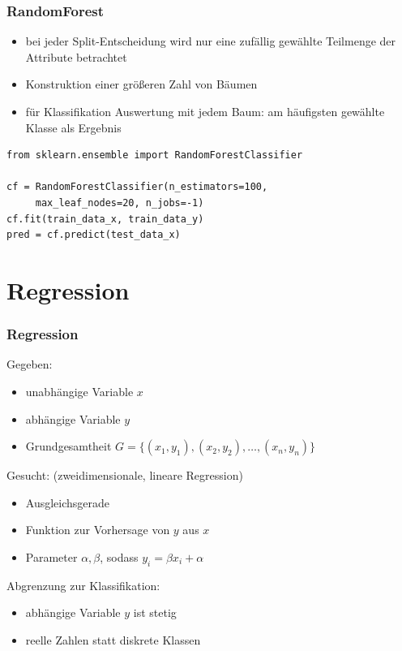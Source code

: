 \begin{frame}[fragile]
  \frametitle{RandomForest}

    \begin{itemize}
      \item bei jeder Split-Entscheidung wird nur eine zufällig gewählte Teilmenge der Attribute betrachtet
      \item Konstruktion einer größeren Zahl von Bäumen
      \item für Klassifikation Auswertung mit jedem Baum: am häufigsten gewählte Klasse als Ergebnis
  \end{itemize}

  \begin{verbatim}
from sklearn.ensemble import RandomForestClassifier

cf = RandomForestClassifier(n_estimators=100,
     max_leaf_nodes=20, n_jobs=-1)
cf.fit(train_data_x, train_data_y)
pred = cf.predict(test_data_x)
\end{verbatim}
\end{frame}



\section{Regression}



\begin{frame}
\frametitle{Regression}

Gegeben:
\begin{itemize}
	\item unabhängige Variable $x$
	\item abhängige Variable $y$
	\item Grundgesamtheit $G = \{(x_1, y_1), (x_2, y_2), \dots, (x_n, y_n)\}$
\end{itemize}

Gesucht: {\scriptsize (zweidimensionale, lineare Regression)}
\begin{itemize}
	\item \glqq{}Ausgleichsgerade\grqq{}
	\item Funktion zur Vorhersage von $y$ aus $x$
	\item Parameter $\alpha, \beta$, sodass $y_i = \beta x_i + \alpha$
\end{itemize}

Abgrenzung zur Klassifikation:
\begin{itemize}
	\item abhängige Variable $y$ ist stetig
	\item reelle Zahlen statt diskrete Klassen
\end{itemize}

\end{frame}

